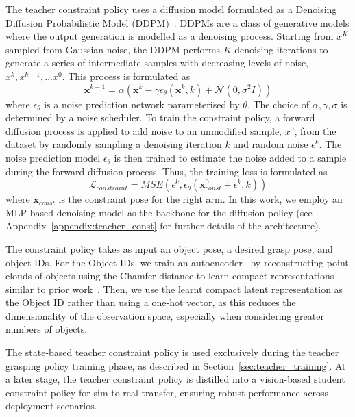 The teacher constraint policy uses a diffusion model formulated as a Denoising Diffusion Probabilistic Model (DDPM)~\cite{ho2020denoising}.
DDPMs are a class of generative models where the output generation is modelled as a denoising process.
Starting from $x^{K}$ sampled from Gaussian noise, the DDPM performs $K$ denoising iterations to generate a series of intermediate samples with decreasing levels of noise, $x^{k}, x^{k-1},...x^{0}$.
This process is formulated as
\begin{equation}
    \mathbf{x}^{k-1} = \alpha(\mathbf{x}^{k} - \gamma \epsilon_{\theta}(\mathbf{x}^{k}, k) + \mathcal{N}(0, \sigma^2I))
\end{equation}
where $\epsilon_{\theta}$ is a noise prediction network parameterised by $\theta$.
The choice of $\alpha, \gamma, \sigma$ is determined by a noise scheduler.
To train the constraint policy, a forward diffusion process is applied to add noise to an unmodified sample, $x^{0}$, from the dataset by randomly sampling a denoising iteration $k$ and random noise $\epsilon^{k}$.
The noise prediction model $\epsilon_{\theta}$ is then trained to estimate the noise added to a sample during the forward diffusion process.
Thus, the training loss is formulated as
\begin{equation}
    \mathcal{L}_{constraint} = \textit{MSE}(\epsilon^{k}, \epsilon_{\theta}(\mathbf{x}^{0}_{const} + \epsilon^{k}, k))
\end{equation}
where $\mathbf{x}_{const}$ is the constraint pose for the right arm.
In this work, we employ an MLP-based denoising model as the backbone for the diffusion policy (see Appendix~\ref{appendix:teacher_const} for further details of the architecture).

The constraint policy takes as input an object pose, a desired grasp pose, and object IDs.
For the Object IDs, we train an autoencoder~\cite{rumelhart1986} by reconstructing point clouds of objects using the Chamfer distance to learn compact representations similar to prior work~\cite{wan2023unidexgraspimprovingdexterousgrasping}.
Then, we use the learnt compact latent representation as the Object ID rather than using a one-hot vector, as this reduces the dimensionality of the observation space, especially when considering greater numbers of objects.


The state-based teacher constraint policy is used exclusively during the teacher grasping policy training phase, as described in Section~\ref{sec:teacher_training}. 
At a later stage, the teacher constraint policy is distilled into a vision-based student constraint policy for sim-to-real transfer, ensuring robust performance across deployment scenarios.

